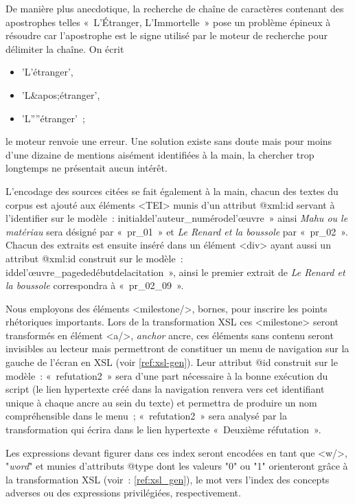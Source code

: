 \documentclass[12pt, a4paper]{article}
\begin{document}
De manière plus anecdotique, la recherche de chaîne de caractères contenant des apostrophes telles «~L'Étranger, L'Immortelle~» pose un problème épineux à résoudre car l'apostrophe est le signe utilisé par le moteur de recherche pour délimiter la chaîne. On écrit 
\begin{itemize}
    \item 'L'étranger', 
    \item 'L\&apos;étranger',
    \item 'L''''étranger'~; 
\end{itemize}
le moteur renvoie une erreur. Une solution existe sans doute mais pour moins d'une dizaine de mentions aisément identifiées à la main, la chercher trop longtemps ne présentait aucun intérêt.


L'encodage des sources citées se fait également à la main, chacun des textes du corpus est ajouté aux éléments <TEI> munis d'un attribut @xml\NoAutoSpaceBeforeFDP:id servant à l'identifier sur le modèle~: initialdel'auteur\_numérodel'œuvre~» ainsi \textit{Mahu ou le matériau} sera désigné par «~pr\_01~» et \textit{Le Renard et la boussole} par «~pr\_02~». Chacun des extraits est ensuite inséré dans un élément <div> ayant aussi un attribut @xml\NoAutoSpaceBeforeFDP:id construit sur le modèle~: iddel'œuvre\_pagededébutdelacitation~», ainsi le premier extrait de \textit{Le Renard et la boussole} correspondra à «~pr\_02\_09~».    

\label{encMilestone} Nous employons des éléments <milestone/>, bornes, pour inscrire les points rhétoriques importants. Lors de la transformation XSL ces <milestone> seront transformés en élément <a/>, \textit{anchor} ancre, ces éléments sans contenu seront invisibles au lecteur mais permettront de constituer un menu de navigation sur la gauche de l'écran en XSL (voir \ref{ref:xsl-gen}). Leur attribut @id construit sur le modèle~: «~refutation2~»
sera d'une part nécessaire à la bonne exécution du script (le lien hypertexte créé dans la navigation renvera vers cet identifiant unique à chaque ancre au sein du texte) et permettra de produire un nom compréhensible dans le menu~; «~refutation2~» sera analysé par la transformation qui écrira dans le lien hypertexte «~Deuxième réfutation~».


\label{encW} Les expressions devant figurer dans ces index seront encodées en tant que <w/>, "\textit{word}" et munies d'attributs @type dont les valeurs "0" ou "1" orienteront grâce à la transformation XSL (voir~: \ref{ref:xsl_gen}), le mot vers l'index des concepts adverses ou des expressions privilégiées, respectivement.
\end{document}
